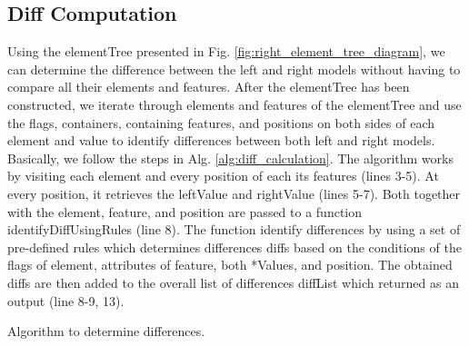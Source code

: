 \documentclass{jot}
\begin{document}
\subsection{Diff Computation}
\label{sec:diff_computation}

Using the \textsf{elementTree} presented in Fig. \ref{fig:right_element_tree_diagram}, we can determine the difference between the left and right models without having to compare all their elements and features. After the \textsf{elementTree} has been constructed, we iterate through elements and features of the \textsf{elementTree} and use the flags, containers, containing features, and positions on both sides of each element and value to identify differences between both left and right models. Basically, we follow the steps in Alg. \ref{alg:diff_calculation}. The algorithm works by visiting each element and every position of each its features (lines 3-5). At every position, it retrieves the \textsf{leftValue} and \textsf{rightValue} (lines 5-7).  Both together with the \textsf{element}, \textsf{feature}, and \textsf{position} are passed to a function \textsf{identifyDiffUsingRules} (line 8). The function identify differences by using a set of pre-defined rules which determines differences \textsf{diffs} based on the conditions of the flags of \textsf{element}, attributes of \textsf{feature}, both \textsf{*Values}, and \textsf{position}. The obtained \textsf{diffs} are then added to the overall list of differences \textsf{diffList} which returned as an output (line 8-9, 13). 

\IncMargin{1.5em}
\begin{algorithm}[H]
    \begin{footnotesize}
    \end{footnotesize}
    \caption{Algorithm to determine differences.}
    \label{alg:diff_calculation}
\end{algorithm}
\DecMargin{1.5em}
\end{document}
